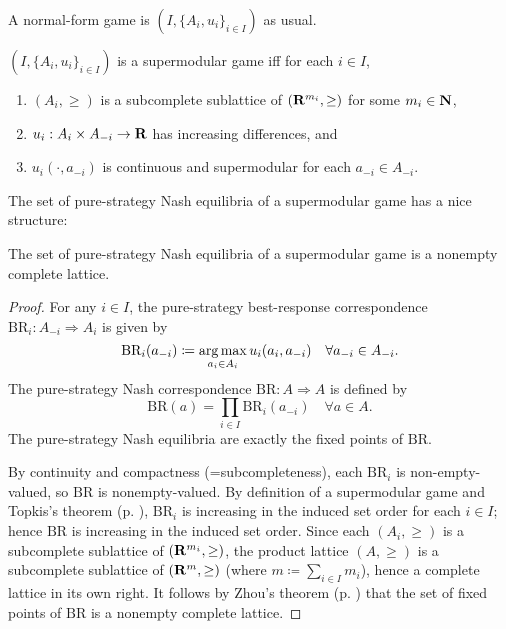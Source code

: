 \documentclass[11pt,letterpaper,reqno,oneside]{article}
\begin{document}
A normal-form game is $(I,\{A_i,u_i\}_{i \in I})$ as usual.
%
\begin{definition}
	$(I,\{A_i,u_i\}_{i \in I})$ is a supermodular game iff for each $i \in I$,
	\begin{enumerate}

		\item $(A_i,\geq)$ is a subcomplete sublattice of $\left(\mathbf{R}^{m_i},\geq\right)$ for some $m_i \in \mathbf{N}$,

		\item $u_i : A_i \times A_{-i} \to \mathbf{R}$ has increasing differences, and

		\item $u_i(\cdot,a_{-i})$ is continuous and supermodular for each $a_{-i} \in A_{-i}$.

	\end{enumerate}
\end{definition}


The set of pure-strategy Nash equilibria of a supermodular game has a nice structure:

\begin{proposition}
	\label{proposition:Zhou_Nash}
	The set of pure-strategy Nash equilibria of a supermodular game is a nonempty complete lattice.
\end{proposition}

\begin{proof}
	For any $i \in I$, the pure-strategy best-response correspondence $\text{BR}_i : A_{-i} \Rightarrow A_i$ is given by
	\begin{equation*}
		\text{BR}_i(a_{-i}) \coloneqq \operatorname*{arg\,max}_{a_i \in A_i} u_i(a_i,a_{-i})
		\quad\forall a_{-i} \in A_{-i} .
	\end{equation*}
	The pure-strategy Nash correspondence $\text{BR} : A \Rightarrow A$ is defined by
	\begin{equation*}
		\text{BR}(a) = \prod_{i \in I} \text{BR}_i(a_{-i}) 
		\quad\forall a \in A .
	\end{equation*}
	The pure-strategy Nash equilibria are exactly the fixed points of $\text{BR}$.

	By continuity and compactness (=subcompleteness), each $\text{BR}_i$ is non-empty-valued, so $\text{BR}$ is nonempty-valued. By definition of a supermodular game and Topkis's theorem (p. \pageref{theorem:Topkis}), $\text{BR}_i$ is increasing in the induced set order for each $i \in I$; hence $\text{BR}$ is increasing in the induced set order. Since each $(A_i,\geq)$ is a subcomplete sublattice of $\left( \mathbf{R}^{m_i}, \geq \right)$, the product lattice $(A,\geq)$ is a subcomplete sublattice of $( \mathbf{R}^m, \geq )$ (where $m \coloneqq \sum_{i \in I} m_i$), hence a complete lattice in its own right. It follows by Zhou's theorem (p. \pageref{theorem:Zhou}) that the set of fixed points of $\text{BR}$ is a nonempty complete lattice.
\end{proof}
\end{document}
